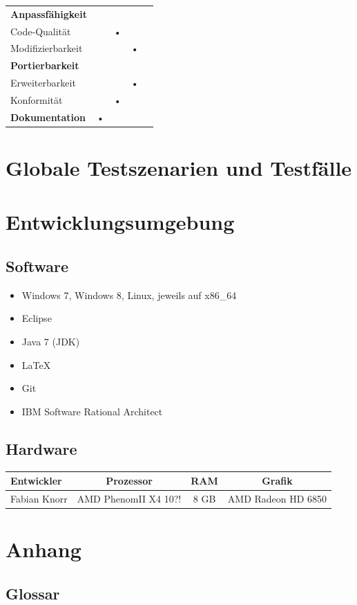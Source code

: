 \documentclass[10pt]{scrreprt}
\begin{document}
\begin{center}
\begin{tabular}{lcccc}
\hline 
\rule[-1ex]{0pt}{4ex} \textbf{Anpassfähigkeit} &  &  &  &  \\ 
\rule[-1ex]{0pt}{4ex} \hspace{10pt} Code-Qualität & & • & & \\ 
\rule[-1ex]{0pt}{4ex} \hspace{10pt} Modifizierbarkeit & & & • & \\ 

\hline 
\rule[-1ex]{0pt}{4ex} \textbf{Portierbarkeit} &  &  &  &  \\ 
\rule[-1ex]{0pt}{4ex} \hspace{10pt} Erweiterbarkeit & & & • & \\ 
\rule[-1ex]{0pt}{4ex} \hspace{10pt} Konformität & & • & & \\ 

\hline 
\rule[-1ex]{0pt}{4ex} \textbf{Dokumentation} & • & & & \\ 
\hline 
\end{tabular} 
\end{center}




\chapter{Globale Testszenarien und Testfälle}





\chapter{Entwicklungsumgebung}
\section{Software}
\begin{itemize}
\item Windows 7, Windows 8, Linux, jeweils auf x86{\_}64
\item Eclipse
\item Java 7 (JDK)
\item \LaTeX
\item Git
\item IBM Software Rational Architect
\end{itemize}


\section{Hardware}
\begin{tabular}{l|c|c|c}
Entwickler & Prozessor & RAM & Grafik \\
\hline
Fabian Knorr & AMD PhenomII X4 10?! & 8 GB & AMD Radeon HD 6850 \\
\end{tabular}



\chapter{Anhang}
\section{Glossar}
\end{document}
